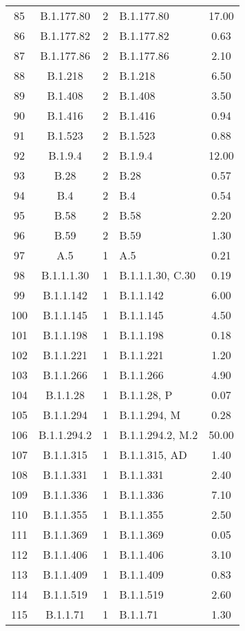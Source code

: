 \begin{longtable}{cccP{4cm}c}
  85 & B.1.177.80 &   2 & B.1.177.80 & 17.00 \\ 
  86 & B.1.177.82 &   2 & B.1.177.82 & 0.63 \\ 
  87 & B.1.177.86 &   2 & B.1.177.86 & 2.10 \\ 
  88 & B.1.218 &   2 & B.1.218 & 6.50 \\ 
  89 & B.1.408 &   2 & B.1.408 & 3.50 \\ 
  90 & B.1.416 &   2 & B.1.416 & 0.94 \\ 
  91 & B.1.523 &   2 & B.1.523 & 0.88 \\ 
  92 & B.1.9.4 &   2 & B.1.9.4 & 12.00 \\ 
  93 & B.28 &   2 & B.28 & 0.57 \\ 
  94 & B.4 &   2 & B.4 & 0.54 \\ 
  95 & B.58 &   2 & B.58 & 2.20 \\ 
  96 & B.59 &   2 & B.59 & 1.30 \\ 
  97 & A.5 &   1 & A.5 & 0.21 \\ 
  98 & B.1.1.1.30 &   1 & B.1.1.1.30, C.30 & 0.19 \\ 
  99 & B.1.1.142 &   1 & B.1.1.142 & 6.00 \\ 
  100 & B.1.1.145 &   1 & B.1.1.145 & 4.50 \\ 
  101 & B.1.1.198 &   1 & B.1.1.198 & 0.18 \\ 
  102 & B.1.1.221 &   1 & B.1.1.221 & 1.20 \\ 
  103 & B.1.1.266 &   1 & B.1.1.266 & 4.90 \\ 
  104 & B.1.1.28 &   1 & B.1.1.28, P & 0.07 \\ 
  105 & B.1.1.294 &   1 & B.1.1.294, M & 0.28 \\ 
  106 & B.1.1.294.2 &   1 & B.1.1.294.2, M.2 & 50.00 \\ 
  107 & B.1.1.315 &   1 & B.1.1.315, AD & 1.40 \\ 
  108 & B.1.1.331 &   1 & B.1.1.331 & 2.40 \\ 
  109 & B.1.1.336 &   1 & B.1.1.336 & 7.10 \\ 
  110 & B.1.1.355 &   1 & B.1.1.355 & 2.50 \\ 
  111 & B.1.1.369 &   1 & B.1.1.369 & 0.05 \\ 
  112 & B.1.1.406 &   1 & B.1.1.406 & 3.10 \\ 
  113 & B.1.1.409 &   1 & B.1.1.409 & 0.83 \\ 
  114 & B.1.1.519 &   1 & B.1.1.519 & 2.60 \\ 
  115 & B.1.1.71 &   1 & B.1.1.71 & 1.30 \\ 

\end{longtable}
